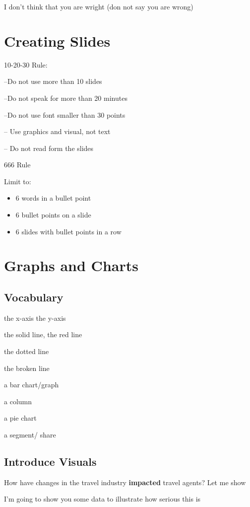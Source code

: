 \documentclass{article}
\begin{document}
I don't think that you are wright (don not say you are wrong)



\section{Creating Slides}


10-20-30 Rule:

--Do not use more than 10 slides

--Do not speak for more than 20 minutes

--Do not use font smaller than 30 points

-- Use graphics and visual, not text

-- Do not read form the slides

666 Rule

Limit to:
\begin{itemize}
\item{6 words in a bullet point}
\item{6 bullet points on a slide}
\item{6 slides with bullet points in a row}
\end{itemize}

\section{Graphs and Charts}

\subsection{Vocabulary}
the x-axis the y-axis

the solid line, the red line

the dotted line

the broken line

a bar chart/graph

a column

a pie chart

a segment/ share

\subsection{Introduce Visuals}

How have changes in the travel industry \textbf{impacted} travel agents? Let me show

I'm going to show you some data to illustrate how serious this is
\end{document}

